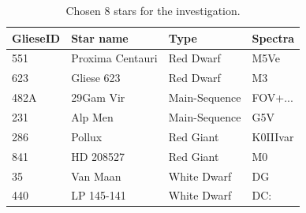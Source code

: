 \documentclass[a4paper,10pt]{article}
\begin{document}
  \begin{table}[h!]
    \begin{center}
      \caption{Chosen 8 stars for the investigation.}
      \begin{tabular}{l | l | l | l}
        \textbf{GlieseID} & \textbf{Star name} & \textbf{Type} & \textbf{Spectra}\\
        \hline
        551 & Proxima Centauri & Red Dwarf & M5Ve\\
        623 & Gliese 623 & Red Dwarf & M3\\
        482A & 29Gam Vir & Main-Sequence & FOV+...\\
        231 & Alp Men & Main-Sequence & G5V\\
        286 & Pollux & Red Giant & K0IIIvar\\
        841 & HD 208527 & Red Giant & M0\\
        35 & Van Maan & White Dwarf & DG\\
        440 & LP 145-141 & White Dwarf & DC:\\
      \end{tabular}
      \label{stars}
    \end{center}
  \end{table}
  
\end{document}
